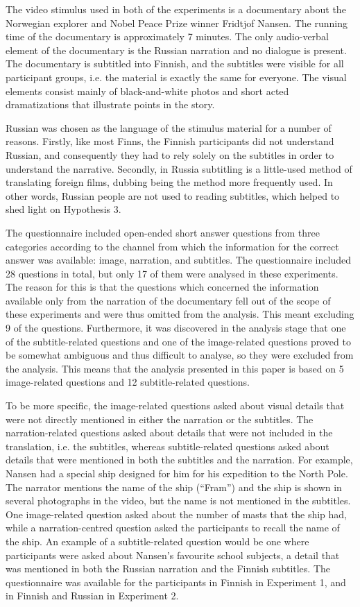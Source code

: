 \documentclass[output=paper]{langsci/langscibook}
\begin{document}
The video stimulus used in both of the experiments is a documentary about the Norwegian explorer and Nobel Peace Prize winner Fridtjof Nansen. The running time of the documentary is approximately 7 minutes. The only audio-verbal element of the documentary is the Russian narration and no dialogue is present. The documentary is subtitled into Finnish, and the subtitles were visible for all participant groups, i.e. the material is exactly the same for everyone. The visual elements consist mainly of black-and-white photos and short acted dramatizations that illustrate points in the story. 

Russian was chosen as the language of the stimulus material for a number of reasons. Firstly, like most Finns, the Finnish participants did not understand Russian, and consequently they had to rely solely on the subtitles in order to understand the narrative. Secondly, in Russia subtitling is a little-used method of translating foreign films, dubbing being the method more frequently used. In other words, Russian people are not used to reading subtitles, which helped to shed light on Hypothesis 3. 

The questionnaire included open-ended short answer questions from three categories according to the channel from which the information for the correct answer was available: image, narration, and subtitles. The questionnaire included 28 questions in total, but only 17 of them were analysed in these experiments. The reason for this is that the questions which concerned the information available only from the narration of the documentary fell out of the scope of these experiments and were thus omitted from the analysis. This meant excluding 9 of the questions. Furthermore, it was discovered in the analysis stage that one of the subtitle-related questions and one of the image-related questions proved to be somewhat ambiguous and thus difficult to analyse, so they were excluded from the analysis. This means that the analysis presented in this paper is based on 5 image-related questions and 12 subtitle-related questions. 

To be more specific, the image-related questions asked about visual details that were not directly mentioned in either the narration or the subtitles. The narration-related questions asked about details that were not included in the translation, i.e. the subtitles, whereas subtitle-related questions asked about details that were mentioned in both the subtitles and the narration. For example, Nansen had a special ship designed for him for his expedition to the North Pole. The narrator mentions the name of the ship (``Fram'') and the ship is shown in several photographs in the video, but the name is not mentioned in the subtitles. One image-related question asked about the number of masts that the ship had, while a narration-centred question asked the participants to recall the name of the ship. An example of a subtitle-related question would be one where participants were asked about Nansen's favourite school subjects, a detail that was mentioned in both the Russian narration and the Finnish subtitles. The questionnaire was available for the participants in Finnish in Experiment 1, and in Finnish and Russian in Experiment 2.
\end{document}
